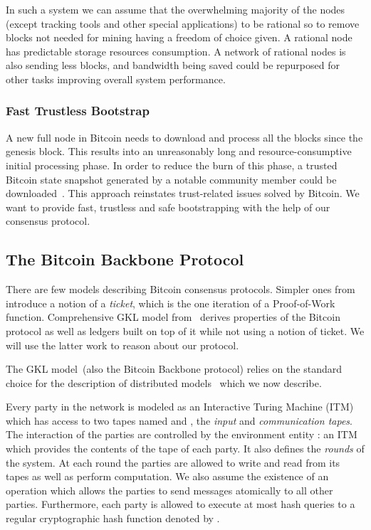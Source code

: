 \documentclass[conference,compsoc]{IEEEtran}
\begin{document}
In such a system we can assume that the overwhelming majority of the nodes (except tracking tools and other special applications) to be rational so to remove blocks not needed for mining having a freedom of choice given. A rational node has predictable storage resources consumption. A network of rational nodes is also sending less blocks, and bandwidth being saved could be repurposed for other tasks improving overall system performance.

\subsubsection{Fast Trustless Bootstrap}

A new full node in Bitcoin needs to download and process all the blocks since the genesis block. This results into an unreasonably long and resource-consumptive initial processing phase. In order to reduce the burn of this phase, a trusted Bitcoin state snapshot generated by a notable community member could be downloaded~\cite{snapshot}. This approach reinstates trust-related issues solved by Bitcoin. We want to provide fast, trustless and safe bootstrapping with the help of our consensus protocol.

\subsection{The Bitcoin Backbone Protocol}
\label{gkl_general}

There are few models describing Bitcoin consensus protocols. Simpler ones from~\cite{miller2014permacoin, milleranonymous} introduce a notion of a \textit{ticket}, which is the one iteration of a Proof-of-Work function. Comprehensive GKL model from~\cite{garay2015bitcoin} derives properties of the Bitcoin protocol as well as ledgers built on top of it while not using a notion of ticket. We will use the latter work to reason about our protocol. 

The GKL model~(also the Bitcoin Backbone protocol) relies on the standard choice for the description of distributed models~\cite{Canetti:2001} which we now describe.

 Every party   in the network is modeled as an Interactive Turing Machine (ITM) which has access to two tapes named  and , the {\it input} and {\it communication tapes}. The interaction of the parties are controlled by the environment entity : an ITM which provides the contents of the  tape of each party. It also defines the {\it rounds} of the system. At each round the parties are allowed to write and read from its tapes as well as perform computation. We also assume the existence of an operation  which allows the parties to send messages atomically to all other parties. Furthermore, each party is allowed to execute at most  hash queries to a regular cryptographic hash function denoted by .  
\end{document}
